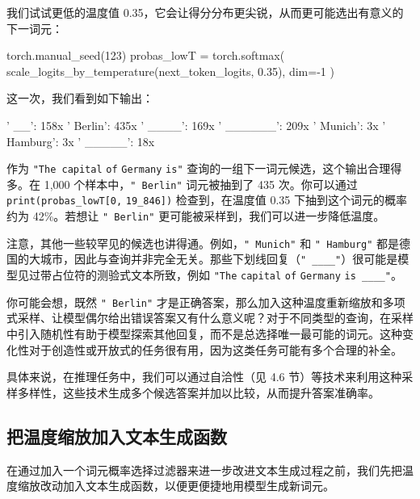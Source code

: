 我们试试更低的温度值 0.35，它会让得分分布更尖锐，从而更可能选出有意义的下一词元：

\begin{codebox}
torch.manual_seed(123)
probas_lowT = torch.softmax(
    scale_logits_by_temperature(next_token_logits, 0.35), dim=-1
)
\end{codebox}

这一次，我们看到如下输出：

\begin{codebox}
' __': 158x
' Berlin': 435x
' ____': 169x
' ______': 209x
' Munich': 3x
' Hamburg': 3x
' _____': 18x
\end{codebox}

作为 \texttt{"}\texttt{The capital} \texttt{of} \texttt{Germany} \texttt{is}\texttt{"} 查询的一组下一词元候选，这个输出合理得多。在 1,000 个样本中，\texttt{"}\texttt{ Berlin}\texttt{"} 词元被抽到了 435 次。你可以通过 \texttt{print(probas\_lowT[0,} \texttt{19\_846])} 检查到，在温度值 0.35 下抽到这个词元的概率约为 42\%。若想让 \texttt{"}\texttt{ Berlin}\texttt{"} 更可能被采样到，我们可以进一步降低温度。

注意，其他一些较罕见的候选也讲得通。例如，\texttt{"}\texttt{ Munich}\texttt{"} 和 \texttt{"}\texttt{ Hamburg}\texttt{"} 都是德国的大城市，因此与查询并非完全无关。那些下划线回复（\texttt{"}\texttt{ \_\_\_\_}\texttt{"}）很可能是模型见过带占位符的测验式文本所致，例如 \texttt{"}\texttt{The} \texttt{capital} \texttt{of} \texttt{Germany} \texttt{is \_\_\_\_}\texttt{"}。

你可能会想，既然 \texttt{"}\texttt{ Berlin}\texttt{"} 才是正确答案，那么加入这种温度重新缩放和多项式采样、让模型偶尔给出错误答案又有什么意义呢？对于不同类型的查询，在采样中引入随机性有助于模型探索其他回复，而不是总选择唯一最可能的词元。这种变化性对于创造性或开放式的任务很有用，因为这类任务可能有多个合理的补全。

具体来说，在推理任务中，我们可以通过自洽性（见 4.6 节）等技术来利用这种采样多样性，这些技术生成多个候选答案并加以比较，从而提升答案准确率。

\subsection{把温度缩放加入文本生成函数}

在通过加入一个词元概率选择过滤器来进一步改进文本生成过程之前，我们先把温度缩放改动加入文本生成函数，以便更便捷地用模型生成新词元。

